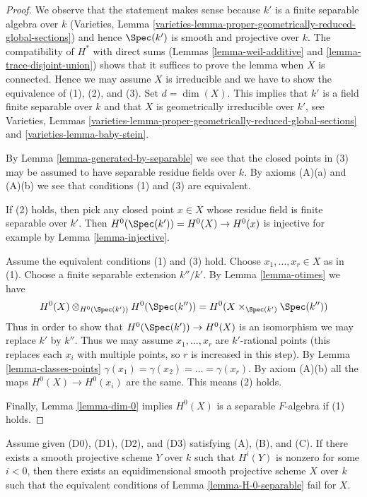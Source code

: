 \begin{proof}
We observe that the statement makes sense because $k'$ is a finite separable
algebra over $k$ (Varieties, Lemma
\ref{varieties-lemma-proper-geometrically-reduced-global-sections})
and hence $\Spec(k')$ is smooth and projective over $k$.
The compatibility of $H^*$ with direct sums
(Lemmas \ref{lemma-weil-additive} and \ref{lemma-trace-disjoint-union})
shows that it suffices to prove the lemma when $X$ is connected.
Hence we may assume $X$ is irreducible and we have to show the
equivalence of (1), (2), and (3). Set $d = \dim(X)$.
This implies that $k'$ is a field finite separable
over $k$ and that $X$ is geometrically irreducible over $k'$, see
Varieties, Lemmas
\ref{varieties-lemma-proper-geometrically-reduced-global-sections} and
\ref{varieties-lemma-baby-stein}.

\medskip\noindent
By Lemma \ref{lemma-generated-by-separable} we see that the closed
points in (3) may be assumed to have separable residue fields over $k$.
By axioms (A)(a) and (A)(b) we see that conditions (1) and (3) are equivalent.

\medskip\noindent
If (2) holds, then pick any closed point $x \in X$ whose residue field
is finite separable over $k'$. Then
$H^0(\Spec(k')) = H^0(X) \to H^0(x)$ is injective for example by
Lemma \ref{lemma-injective}.

\medskip\noindent
Assume the equivalent conditions (1) and (3) hold. Choose
$x_1, \ldots, x_r \in X$ as in (1). Choose a finite separable
extension $k''/k'$. By Lemma \ref{lemma-otimes} we have
$$
H^0(X) \otimes_{H^0(\Spec(k'))} H^0(\Spec(k'')) =
H^0(X \times_{\Spec(k')} \Spec(k''))
$$
Thus in order to show that
$H^0(\Spec(k')) \to H^0(X)$ is an isomorphism
we may replace $k'$ by $k''$. Thus we may assume $x_1, \ldots, x_r$
are $k'$-rational points (this replaces each $x_i$ with multiple
points, so $r$ is increased in this step). By Lemma \ref{lemma-classes-points}
$\gamma(x_1) = \gamma(x_2) = \ldots = \gamma(x_r)$.
By axiom (A)(b) all the maps $H^0(X) \to H^0(x_i)$
are the same. This means (2) holds.

\medskip\noindent
Finally, Lemma \ref{lemma-dim-0} implies
$H^0(X)$ is a separable $F$-algebra if (1) holds.
\end{proof}

\begin{lemma}
\label{lemma-negative-cohomology}
Assume given (D0), (D1), (D2), and (D3) satisfying (A), (B), and (C).
If there exists a smooth projective scheme $Y$ over $k$ such that
$H^i(Y)$ is nonzero for some $i < 0$, then there exists an equidimensional
smooth projective scheme $X$ over $k$ such that the equivalent conditions
of Lemma \ref{lemma-H-0-separable} fail for $X$.
\end{lemma}

